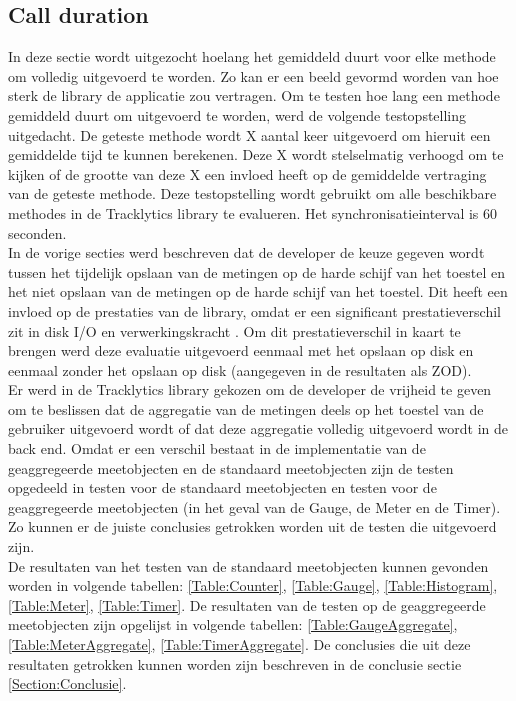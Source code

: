 \subsection{Call duration}
In deze sectie wordt uitgezocht hoelang het gemiddeld duurt voor elke methode om volledig uitgevoerd te worden. Zo kan er een beeld gevormd worden van hoe sterk de library de applicatie zou vertragen. Om te testen hoe lang een methode gemiddeld duurt om uitgevoerd te worden, werd de volgende testopstelling uitgedacht. De geteste methode wordt X aantal keer uitgevoerd om hieruit een gemiddelde tijd te kunnen berekenen. Deze X wordt stelselmatig verhoogd om te kijken of de grootte van deze X een invloed heeft op de gemiddelde vertraging van de geteste methode. Deze testopstelling wordt gebruikt om alle beschikbare methodes in de Tracklytics library te evalueren. Het synchronisatieinterval is 60 seconden. \\

In de vorige secties werd beschreven dat de developer de keuze gegeven wordt tussen het tijdelijk opslaan van de metingen op de harde schijf van het toestel en het niet opslaan van de metingen op de harde schijf van het toestel. Dit heeft een invloed op de prestaties van de library, omdat er een significant prestatieverschil zit in disk I/O en verwerkingskracht \cite{diskIO}. Om dit prestatieverschil in kaart te brengen werd deze evaluatie uitgevoerd eenmaal met het opslaan op disk en eenmaal zonder het opslaan op disk (aangegeven in de resultaten als ZOD).\\

Er werd in de Tracklytics library gekozen om de developer de vrijheid te geven om te beslissen dat de aggregatie van de metingen deels op het toestel van de gebruiker uitgevoerd wordt of dat deze aggregatie volledig uitgevoerd wordt in de back end. Omdat er een verschil bestaat in de implementatie van de geaggregeerde meetobjecten en de standaard meetobjecten zijn de testen opgedeeld in testen voor de standaard meetobjecten en testen voor de geaggregeerde meetobjecten (in het geval van de Gauge, de Meter en de Timer). Zo kunnen er de juiste conclusies getrokken worden uit de testen die uitgevoerd zijn.\\


De resultaten van het testen van de standaard meetobjecten kunnen gevonden worden in volgende tabellen: \ref{Table:Counter}, \ref{Table:Gauge}, \ref{Table:Histogram}, \ref{Table:Meter}, \ref{Table:Timer}. De resultaten van de testen op de geaggregeerde meetobjecten zijn opgelijst in volgende tabellen: \ref{Table:GaugeAggregate}, \ref{Table:MeterAggregate}, \ref{Table:TimerAggregate}. De conclusies die uit deze resultaten getrokken kunnen worden zijn beschreven in de conclusie sectie \ref{Section:Conclusie}. \\



